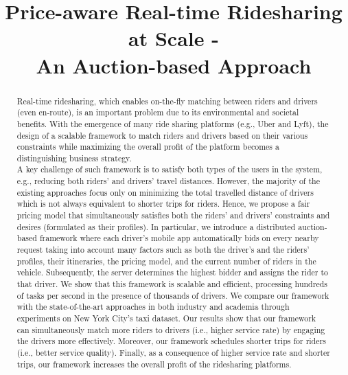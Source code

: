 \documentclass[]{vldb}
\title{Price-aware Real-time Ridesharing at Scale -\\An Auction-based Approach}
\author{}
\begin{document}
\maketitle

\begin{abstract}
Real-time ridesharing, which enables on-the-fly matching between riders and drivers (even en-route), is an important problem due to its environmental and societal benefits. With the emergence of many ride sharing platforms (e.g., Uber and Lyft), the design of a scalable framework to match riders and drivers based on their various constraints while maximizing the overall profit of the platform becomes a distinguishing business strategy.\\
A key challenge of such framework is to satisfy both types of the users in the system, e.g., reducing both riders' and drivers' travel distances. However, the majority of the existing approaches focus only on minimizing the total travelled distance of drivers which is not always equivalent to shorter trips for riders. Hence, we propose a fair pricing model that simultaneously satisfies both the riders' and drivers' constraints and desires (formulated as their profiles). In particular, we introduce a distributed auction-based framework where each driver's mobile app automatically bids on every nearby request taking into account many factors such as both the driver's and the riders' profiles, their itineraries, the pricing model, and the current number of riders in the vehicle.  Subsequently, the server determines the highest bidder and assigns the rider to that driver. We show that this framework is scalable and efficient, processing hundreds of tasks per second in the presence of thousands of drivers. We compare our framework with the state-of-the-art approaches in both industry and academia through experiments on New York City's taxi dataset.  Our results show that our framework can simultaneously match more riders to drivers (i.e., higher service rate) by engaging the drivers more effectively. Moreover, our framework schedules shorter trips for riders (i.e., better service quality). Finally, as a consequence of higher service rate and shorter trips, our framework increases the overall profit of the ridesharing platforms.
\end{abstract}



%
%






\vspace{-0.1in}

\begin{scriptsize}


\end{scriptsize}
\end{document}
